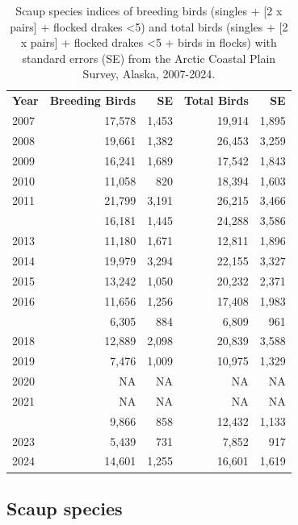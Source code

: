 \documentclass[
]{article}
\begin{document}
\begingroup\fontsize{10}{12}\selectfont

\begin{longtable}[t]{lrrrr}

\caption{\label{tbl-UNSC}Scaup species indices of breeding birds
(singles + {[}2 x pairs{]} + flocked drakes \textless5) and total birds
(singles + {[}2 x pairs{]} + flocked drakes \textless5 + birds in
flocks) with standard errors (SE) from the Arctic Coastal Plain Survey,
Alaska, 2007-2024.}

\tabularnewline

\\
\toprule
\textbf{Year} & \textbf{Breeding Birds} & \textbf{SE} & \textbf{Total Birds} & \textbf{SE}\\
\midrule
2007 & 17,578 & 1,453 & 19,914 & 1,895\\
2008 & 19,661 & 1,382 & 26,453 & 3,259\\
2009 & 16,241 & 1,689 & 17,542 & 1,843\\
2010 & 11,058 & 820 & 18,394 & 1,603\\
2011 & 21,799 & 3,191 & 26,215 & 3,466\\
\addlinespace
2012 & 16,181 & 1,445 & 24,288 & 3,586\\
2013 & 11,180 & 1,671 & 12,811 & 1,896\\
2014 & 19,979 & 3,294 & 22,155 & 3,327\\
2015 & 13,242 & 1,050 & 20,232 & 2,371\\
2016 & 11,656 & 1,256 & 17,408 & 1,983\\
\addlinespace
2017 & 6,305 & 884 & 6,809 & 961\\
2018 & 12,889 & 2,098 & 20,839 & 3,588\\
2019 & 7,476 & 1,009 & 10,975 & 1,329\\
2020 & NA & NA & NA & NA\\
2021 & NA & NA & NA & NA\\
\addlinespace
2022 & 9,866 & 858 & 12,432 & 1,133\\
2023 & 5,439 & 731 & 7,852 & 917\\
2024 & 14,601 & 1,255 & 16,601 & 1,619\\
\bottomrule

\end{longtable}

\endgroup{}

\newpage{}

\subsection*{Scaup species}\label{scaup-species-2}
\end{document}
